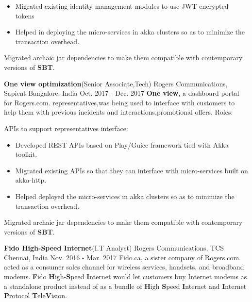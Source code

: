 \begin{cventries}
{\begin{cvitems}
\begin{itemize}
\item Migrated existing identity management modules to use JWT encrypted tokens
\end{itemize}
\begin{itemize}
\item Helped in deploying the micro-services in akka clusters so as to minimize the transaction overhead. 
\end{itemize}
        \item {Migrated archaic jar dependencies to make them compatible with contemporary versions of \textbf{SBT}.}
             \end{cvitems}
    }
  \experienceentry
    {\textbf{One view optimization}(Senior Associate,Tech)}
    {Rogers Communications, Sapient}
    {Bangalore, India}
    {Oct. 2017 - Dec. 2017}
    {\textbf{One view}, a dashboard portal for Rogers.com. representatives,was being used to interface with customers to help them with previous incidents and interactions,promotional offers. }
    {Roles:}
    {
      \begin{cvitems}
        \item {APIs to support representatives interface:}
\begin{itemize}
\item Developed REST APIs based on Play/Guice framework tied with Akka toolkit.
\end{itemize}
\begin{itemize}
\item Migrated existing APIs so that they can interface with micro-services built on akka-http.
\end{itemize}
\begin{itemize}
\item Helped deployed the micro-services in akka clusters so as to minimize the transaction overhead. 
\end{itemize}
        \item {Migrated archaic jar dependencies to make them compatible with contemporary versions of \textbf{SBT}.}
             \end{cvitems}
    }
    \experienceentry
    {\textbf{Fido High-Speed Internet}(I.T Analyst)}
    {Rogers Communications, TCS}
    {Chennai, India}
    {Nov. 2016 - Mar. 2017}
    {Fido.ca, a sister company of Rogers.com. acted as a consumer sales channel for wireless services, handsets, and broadband modems. \textbf{F}ido \textbf{H}igh-\textbf{S}peed \textbf{I}nternet would let customers buy Internet modems as a standalone product instead of as a bundle of \textbf{H}igh \textbf{S}peed \textbf{I}nternet and \textbf{I}nternet \textbf{P}rotocol \textbf{T}ele\textbf{V}ision. }

\end{cventries}

